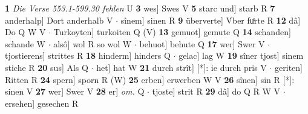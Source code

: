 \documentclass[8pt,a4paper,notitlepage]{article}
\begin{document}
\begin{table}[ht]
\begin{minipage}[t]{0.5\linewidth}
\textbf{1} \textit{Die Verse 553.1-599.30 fehlen} U  \textbf{3} wes] Swes V \textbf{5} starc und] starb R \textbf{7} anderhalp] Dort anderhalb V  $\cdot$ sînem] sinen R \textbf{9} überverte] V́ber fuͦrte R \textbf{12} dâ] Do Q W V  $\cdot$ Turkoyten] turkoiten Q (V) \textbf{13} gemuot] gemute Q \textbf{14} schanden] schande W  $\cdot$ alsô] wol R so wol W  $\cdot$ behuot] behute Q \textbf{17} wer] Swer V  $\cdot$ tjostierens] strittes R \textbf{18} hinderm] hinders Q  $\cdot$ gelac] lag W \textbf{19} sîner tjost] sinem stiche R \textbf{20} sus] Als Q  $\cdot$ het] hat W \textbf{21} durch strît] [*]: ie durch pris V  $\cdot$ geriten] Ritten R \textbf{24} spern] sporn R (W) \textbf{25} erben] erwerben W V \textbf{26} sînen] sin R [*]: sinen V \textbf{27} wer] Swer V \textbf{28} er] \textit{om.} Q  $\cdot$ tjoste] strit R \textbf{29} dâ] do Q R W V  $\cdot$ ersehen] gesechen R \newline
\end{minipage}
\end{table}
\end{document}
